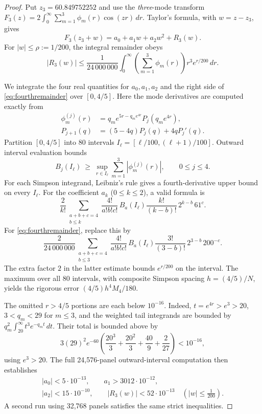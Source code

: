 \begin{proof}
Put $z_3=60.849752252$ and use the \emph{three}-mode transform
$F_3(z)=2\int_0^\infty\sum_{m=1}^3\phi_m(r)\cos(zr)\,dr$.
Taylor's formula, with $w=z-z_3$, gives
\[
F_3(z_3+w)=a_0+a_1w+a_2w^2+R_3(w).
\]
For $|w|\le\rho:=1/200$, the integral remainder obeys
\begin{equation}\label{eq:fourthremainder}
|R_3(w)|\le \frac1{24\,000\,000}
\int_0^\infty\left(\sum_{m=1}^3\phi_m(r)\right)
r^3e^{r/200}\,dr.
\end{equation}

We integrate the four real quantities for $a_0,a_1,a_2$
and the right side of \eqref{eq:fourthremainder} over
$[0,4/5]$. Here the mode derivatives are computed
exactly from
\begin{align*}
\phi_m^{(j)}(r)
&=q_me^{5r-q_me^{4r}}P_j(q_me^{4r}),\\
P_{j+1}(q)
&=(5-4q)P_j(q)+4qP_j'(q).
\end{align*}
Partition $[0,4/5]$ into $80$ intervals
$I_\ell=[\ell/100,(\ell+1)/100]$. Outward
interval evaluation bounds
\[
B_j(I_\ell)\ \ge\
\sup_{r\in I_\ell}
\sum_{m=1}^3|\phi_m^{(j)}(r)|,\qquad 0\le j\le4.
\]
For each Simpson integrand, Leibniz's rule gives
a fourth-derivative upper bound on every $I_\ell$.
For the coefficient $a_k$ ($0\le k\le2$),
a valid formula is
\[
\frac2{k!}\!\!
\sum_{\substack{a+b+c=4\\b\le k}}
\frac{4!}{a!b!c!}\,
B_a(I_\ell)\frac{k!}{(k-b)!}\,
2^{k-b}\,61^c .
\]
For \eqref{eq:fourthremainder}, replace this by
\[
\frac2{24\,000\,000}
\!\!\sum_{\substack{a+b+c=4\\b\le3}}
\frac{4!}{a!b!c!}\,
B_a(I_\ell)\frac{3!}{(3-b)!}\,
2^{3-b}\,200^{-c}.
\]
The extra factor $2$ in the latter estimate bounds
$e^{r/200}$ on the interval.
The maximum over all $80$ intervals, with composite
Simpson spacing $h=(4/5)/N$, yields the rigorous
error $(4/5)h^4M_4/180$.

The omitted $r>4/5$ portions are each below
$10^{-16}$. Indeed, $t=e^{4r}>e^3>20$,
$3<q_m<29$ for $m\le3$, and the weighted
tail integrands are bounded by
$q_m^2\int_{20}^\infty t^3e^{-q_mt}\,dt$.
Their total is bounded above by
\[
3(29)^2e^{-60}
\left(\frac{20^3}{3}+\frac{20^2}{3}
+\frac{40}{9}+\frac2{27}\right)<10^{-16},
\]
using $e^3>20$.
The full 24,576-panel outward-interval computation
then establishes
\begin{equation}\label{eq:fourthTaylor}
\boxed{\begin{gathered}
|a_0|<5\cdot10^{-13},\qquad
a_1>3012\cdot10^{-12},\\
|a_2|<15\cdot10^{-10},\qquad
|R_3(w)|<52\cdot10^{-13}
\quad(|w|\le\tfrac1{200}).
\end{gathered}}
\end{equation}
A second run using 32,768 panels satisfies
the same strict inequalities.


\end{proof}
